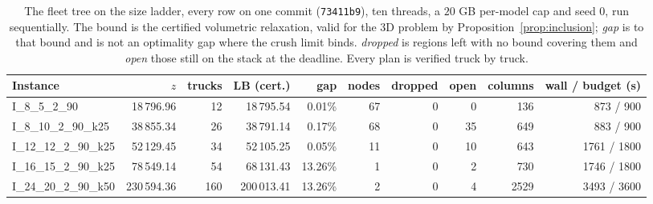 \begin{table}[!htbp]
\centering
\small
\caption{The fleet tree on the size ladder, every row on one commit (\texttt{73411b9}), ten threads, a $20$ GB per-model cap and seed $0$, run sequentially. The bound is the certified volumetric relaxation, valid for the 3D problem by Proposition~\ref{prop:inclusion}; \emph{gap} is to that bound and is not an optimality gap where the crush limit binds. \emph{dropped} is regions left with no bound covering them and \emph{open} those still on the stack at the deadline. Every plan is verified truck by truck.}
\label{tab:fleet}
\begin{tabular}{lrrrrrrrrr}
\toprule
Instance & $z$ & trucks & LB (cert.) & gap & nodes & dropped & open & columns & wall / budget (s) \\
\midrule
I\_8\_5\_2\_90 & 18\,796.96 & 12 & 18\,795.54 & 0.01\% & 67 & 0 & 0 & 136 & 873 / 900 \\
I\_8\_10\_2\_90\_k25 & 38\,855.34 & 26 & 38\,791.14 & 0.17\% & 68 & 0 & 35 & 649 & 883 / 900 \\
I\_12\_12\_2\_90\_k25 & 52\,129.45 & 34 & 52\,105.25 & 0.05\% & 11 & 0 & 10 & 643 & 1761 / 1800 \\
I\_16\_15\_2\_90\_k25 & 78\,549.14 & 54 & 68\,131.43 & 13.26\% & 1 & 0 & 2 & 730 & 1746 / 1800 \\
I\_24\_20\_2\_90\_k50 & 230\,594.36 & 160 & 200\,013.41 & 13.26\% & 2 & 0 & 4 & 2529 & 3493 / 3600 \\
\bottomrule
\end{tabular}
\end{table}
